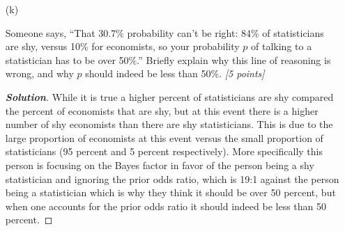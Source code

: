 \documentclass[12pt]{article}
\newenvironment{solution}{\begin{proof}[\textbf{\textit{Solution}}] }{\end{proof}}
\begin{document}
\begin{itemize}
\item[(k)]

Someone says, ``That 30.7\% probability can't be right: 84\% of statisticians are shy, versus 10\% for economists, so your probability $p$ of talking to a statistician has to be over 50\%.'' Briefly explain why this line of reasoning is wrong, and why $p$ should indeed be less than 50\%. \textit{[5 points]}
\begin{solution}
    While it is true a higher percent of statisticians are shy compared the percent of economists that are shy, but at this event there is a higher number of shy economists than there are shy statisticians. This is due to the large proportion of economists at this event versus the small proportion of statisticians (95 percent and 5 percent respectively). More specifically this person is focusing on the Bayes factor in favor of the person being a shy statistician and ignoring the prior odds ratio, which is 19:1 against the person being a statistician which is why they think it should be over 50 percent, but when one accounts for the prior odds ratio it should indeed be less than 50 percent.
\end{solution}


\end{itemize}
\end{document}

